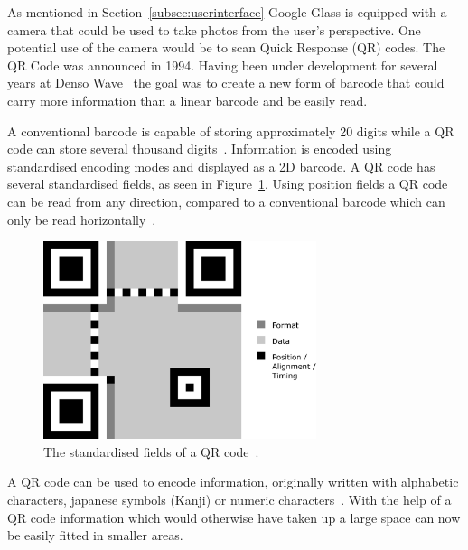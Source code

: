As mentioned in Section~\ref{subsec:userinterface} Google Glass is equipped with a camera that could be used to take photos from the user's perspective. One potential use of the camera would be to scan Quick Response (QR) codes. The QR Code was announced in 1994. Having been under development for several years at Denso Wave~\cite{qrCodeHistory} the goal was to create a new form of barcode that could carry more information than a linear barcode and be easily read.

A conventional barcode is capable of storing approximately 20 digits while a QR code can store several thousand digits~\cite{qrCodeType}. Information is encoded using standardised encoding modes and displayed as a 2D barcode. A QR code has several standardised fields, as seen in Figure~\ref{qrcodeMall}. Using position fields a QR code can be read from any direction, compared to a conventional barcode which can only be read horizontally~\cite{qrCodeAbout}.

	
	\begin{figure}[H]%
		\centering
		\includegraphics[width=80mm]{images/qrcodeMall}
		\caption{The standardised fields of a QR code~\cite{qrCodeWiki}.}
		\label{qrcodeMall}
	\end{figure}
	 
A QR code can be used to encode information, originally written with alphabetic characters, japanese symbols (Kanji) or numeric characters~\cite{qrCodeVersion}. With the help of a QR code information which would otherwise have taken up a large space can now be easily fitted in smaller areas.


